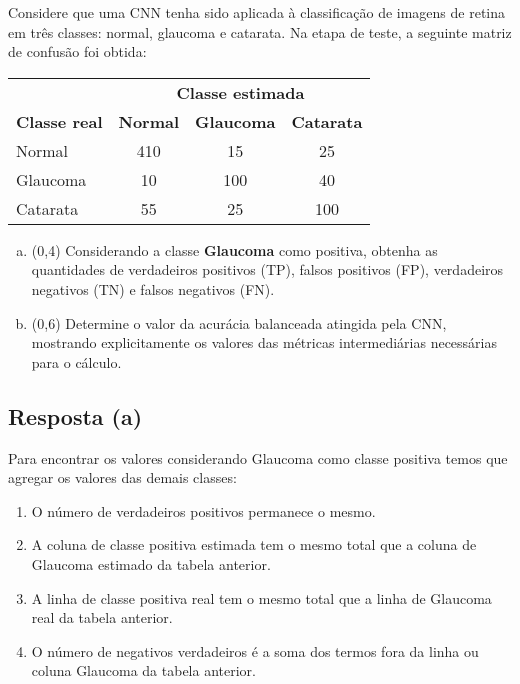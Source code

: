 \documentclass[final,3p]{elsarticle}
\numberwithin{equation}{section}
\begin{document}
    Considere que uma CNN tenha sido aplicada à classificação de imagens de retina em três classes: normal, glaucoma e catarata. Na etapa de teste, a seguinte matriz de confusão foi obtida:

    \begin{table}[H]
        \centering
        \begin{tabular}{l c c c}
            \toprule
             & \multicolumn{3}{c}{\textbf{Classe estimada}} \\
            \textbf{Classe real} & \textbf{Normal} & \textbf{Glaucoma} & \textbf{Catarata} \\
            \midrule
            Normal & 410 & 15 & 25 \\
            Glaucoma & 10 & 100 & 40 \\
            Catarata & 55 & 25 & 100 \\
            \bottomrule
        \end{tabular}
    \end{table}

    \begin{enumerate}[(a)]
        \item (0,4) Considerando a classe \textbf{Glaucoma} como positiva, obtenha as quantidades de verdadeiros positivos (TP), falsos positivos (FP), verdadeiros negativos (TN) e falsos negativos (FN).
        \item (0,6) Determine o valor da acurácia balanceada atingida pela CNN, mostrando explicitamente os valores das métricas intermediárias necessárias para o cálculo.
    \end{enumerate}

    \subsection{Resposta \textbf{(a)}}

        Para encontrar os valores considerando Glaucoma como classe positiva temos que agregar os valores das demais classes:

        \begin{enumerate}
            \item O número de verdadeiros positivos permanece o mesmo.
            \item A coluna de classe positiva estimada tem o mesmo total que a coluna de Glaucoma estimado da tabela anterior.
            \item A linha de classe positiva real tem o mesmo total que a linha de Glaucoma real da tabela anterior.
            \item O número de negativos verdadeiros é a soma dos termos fora da linha ou coluna Glaucoma da tabela anterior.
        \end{enumerate}
\end{document}
